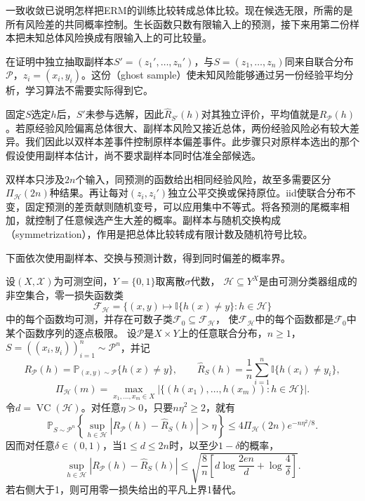 一致收敛已说明怎样把ERM的训练比较转成总体比较。现在候选无限，所需的是所有风险差的共同概率控制。生长函数只数有限输入上的预测，接下来用第二份样本把未知总体风险换成有限输入上的可比较量。

在证明中独立抽取副样本$S'=(z_1',\ldots,z_n')$，与$S=(z_1,\ldots,z_n)$同来自联合分布$\mathcal P$，$z_i=(x_i,y_i)$。这份（ghost sample）使未知风险能够通过另一份经验平均分析，学习算法不需要实际得到它。

固定$S$选定$h$后，$S'$未参与选解，因此$\hat R_{S'}(h)$对其独立评价，平均值就是$R_{\mathcal P}(h)$。若原经验风险偏离总体很大、副样本风险又接近总体，两份经验风险必有较大差异。我们因此以双样本差事件控制原样本偏差事件。此步骤只对原样本选出的那个假设使用副样本估计，尚不要求副样本同时估准全部候选。

双样本只涉及$2n$个输入，同预测的函数给出相同经验风险，故至多需要区分$\Pi_{\mathcal H}(2n)$种结果。再让每对$(z_i,z_i')$独立公平交换或保持原位。iid使联合分布不变，固定预测的差贡献则随机变号，可以应用集中不等式。将各预测的尾概率相加，就控制了任意候选产生大差的概率。副样本与随机交换构成（symmetrization），作用是把总体比较转成有限计数及随机符号比较。

下面依次使用副样本、交换与预测计数，得到同时偏差的概率界。

\begin{theorem}[VC一致收敛界]
\label{thm:vc-uniform-convergence}
设$(X,\mathcal X)$为可测空间，$Y=\{0,1\}$取离散$\sigma$代数，
$\mathcal H\subseteq Y^X$是由可测分类器组成的非空集合，零一损失函数类
\[
 \mathcal F_{\mathcal H}
 =\{(x,y)\mapsto\mathbb I\{h(x)\neq y\}:h\in\mathcal H\}
\]
中的每个函数均可测，并存在可数子类$\mathcal F_0\subseteq\mathcal F_{\mathcal H}$，
使$\mathcal F_{\mathcal H}$中的每个函数都是$\mathcal F_0$中某个函数序列的逐点极限。
设$\mathcal P$是$X\times Y$上的任意联合分布，$n\geq1$，
$S=((x_i,y_i))_{i=1}^n\sim\mathcal P^n$，并记
\[
 R_{\mathcal P}(h)=\mathbb P_{(x,y)\sim\mathcal P}\{h(x)\neq y\},\qquad
 \hat R_S(h)=\frac1n\sum_{i=1}^n\mathbb I\{h(x_i)\neq y_i\},
\]
\[
 \Pi_{\mathcal H}(m)
 =\max_{x_1,\ldots,x_m\in X}
 \left|\{(h(x_1),\ldots,h(x_m)):h\in\mathcal H\}\right|.
\]
令$d=\operatorname{VC}(\mathcal H)$。对任意$\eta>0$，只要$n\eta^2\geq2$，就有
\begin{equation}
 \mathbb P_{S\sim\mathcal P^n}\left\{
   \sup_{h\in\mathcal H}|R_{\mathcal P}(h)-\hat R_S(h)|>\eta
 \right\}
 \leq4\Pi_{\mathcal H}(2n)e^{-n\eta^2/8}.
 \label{eq:vc-symmetrization-probability}
\end{equation}
因而对任意$\delta\in(0,1)$，当$1\leq d\leq2n$时，以至少$1-\delta$的概率，
\begin{equation}
 \sup_{h\in\mathcal H}|R_{\mathcal P}(h)-\hat R_S(h)|
 \leq
 \sqrt{\frac8n\left[
   d\log\frac{2en}{d}+\log\frac4\delta
 \right]}.
 \label{eq:vc-uniform-bound}
\end{equation}
若右侧大于1，则可用零一损失给出的平凡上界1替代。
\end{theorem}

